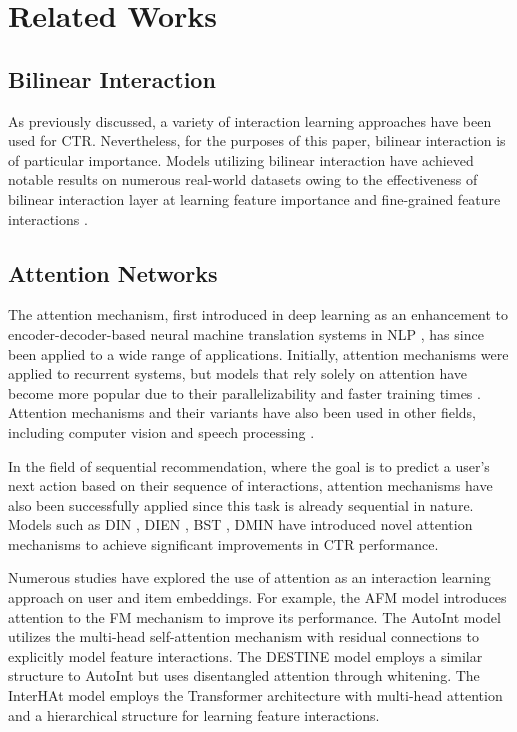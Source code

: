 \documentclass{article}
\begin{document}
\section{Related Works}

\subsection{Bilinear Interaction}

As previously discussed, a variety of interaction learning approaches have been used for CTR. Nevertheless, for the purposes of this paper, bilinear interaction is of particular importance. Models utilizing bilinear interaction have achieved notable results on numerous real-world datasets owing to the effectiveness of bilinear interaction layer at learning feature importance and fine-grained feature interactions \cite{fibinet2019, fibinetpp2022}.

\subsection{Attention Networks}

The attention mechanism, first introduced in deep learning as an enhancement to encoder-decoder-based neural machine translation systems in NLP \cite{attention2016}, has since been applied to a wide range of applications. Initially, attention mechanisms were applied to recurrent systems, but models that rely solely on attention have become more popular due to their parallelizability and faster training times \cite{vaswani2023attention}. Attention mechanisms and their variants have also been used in other fields, including computer vision and speech processing \cite{guo2022attention}.

In the field of sequential recommendation, where the goal is to predict a user’s next action based on their sequence of interactions, attention mechanisms have also been successfully applied since this task is already sequential in nature. Models such as DIN \cite{din2018}, DIEN \cite{dien2018}, BST \cite{bst2019}, DMIN \cite{dmin2020} have introduced novel attention mechanisms to achieve significant improvements in CTR performance.

Numerous studies have explored the use of attention as an interaction learning approach on user and item embeddings. For example, the AFM \cite{afm2017} model introduces attention to the FM mechanism to improve its performance. The AutoInt \cite{autoint2019} model utilizes the multi-head self-attention mechanism  with residual connections to explicitly model feature interactions. The DESTINE \cite{destine2021} model employs a similar structure to AutoInt but uses disentangled attention through whitening. The InterHAt \cite{interhat2020} model employs the Transformer architecture with multi-head attention and a hierarchical structure for learning feature interactions.
\end{document}
